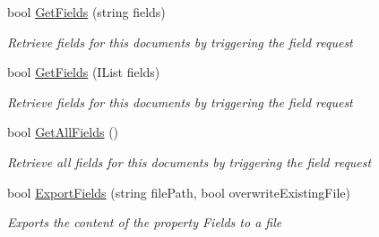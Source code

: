 \begin{DoxyCompactItemize}
bool \hyperlink{class_document_object_a8883fec3b5b1b6e2e43f4b5ca4092684}{Get\+Fields} (string fields)
\begin{DoxyCompactList}\small\item\em Retrieve fields for this documents by triggering the field request \end{DoxyCompactList}\item 
bool \hyperlink{class_document_object_a8e38704e02850b2480d29d184ae2c0e0}{Get\+Fields} (I\+List fields)
\begin{DoxyCompactList}\small\item\em Retrieve fields for this documents by triggering the field request \end{DoxyCompactList}\item 
bool \hyperlink{class_document_object_a5e070c7c0a45ac06422ee992c841e780}{Get\+All\+Fields} ()
\begin{DoxyCompactList}\small\item\em Retrieve all fields for this documents by triggering the field request \end{DoxyCompactList}\item 
bool \hyperlink{class_document_object_a1a763aa01710b370634f46c89b7d2d8e}{Export\+Fields} (string file\+Path, bool overwrite\+Existing\+File)
\begin{DoxyCompactList}\small\item\em Exports the content of the property \textquotesingle{}Fields\textquotesingle{} to a file \end{DoxyCompactList}\end{DoxyCompactItemize}
